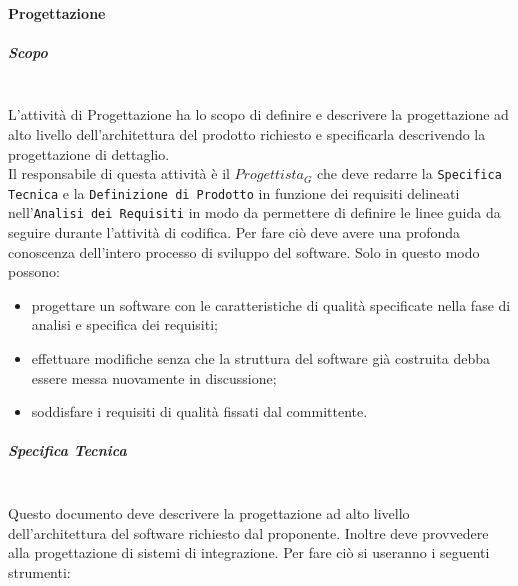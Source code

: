 		\paragraph{Progettazione}
			\subparagraph{Scopo}
			\mbox{}\\
			L'attività di Progettazione  ha lo scopo di definire e descrivere la progettazione ad alto livello dell'architettura del prodotto richiesto e specificarla descrivendo la progettazione di dettaglio. \\
			Il responsabile di questa attività è il \emph{$Progettista_G$} che deve redarre la \texttt{Specifica Tecnica} e la \texttt{Definizione di Prodotto} in funzione dei requisiti delineati nell'\texttt{Analisi dei Requisiti} in modo da permettere di definire le linee guida da seguire durante l'attività di codifica.
			Per fare ciò deve avere una profonda conoscenza dell'intero processo di sviluppo del software.
			Solo in questo modo possono:
			\begin{itemize}
				\item progettare un software con le caratteristiche di qualità specificate nella fase di analisi e specifica dei requisiti;
				\item effettuare modifiche senza che la struttura del software già costruita debba essere messa nuovamente in discussione;
				\item soddisfare i requisiti di qualità fissati dal committente.
			\end{itemize}
			\subparagraph{Specifica Tecnica}
			\mbox{}\\
			Questo documento deve descrivere la progettazione ad alto livello dell'architettura del software richiesto dal proponente. Inoltre deve provvedere alla progettazione di sistemi di integrazione. 
			Per fare ciò si useranno i seguenti strumenti:
